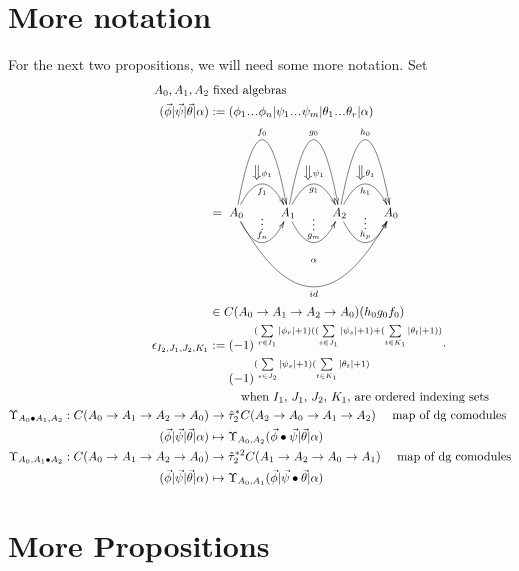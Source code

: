 \section{More notation}
For the next two propositions, we will need 
some more notation. Set
\begin{align*}
A_0, A_1, A_2
&\textrm{ fixed algebras}\\
(\vec{\phi} | \vec{\psi} | \vec{\theta}| \alpha) 
&:= 
(\phi_1\smdots\phi_n | \psi_1\smdots\psi_m| 
  \theta_1 \smdots \theta_r|\alpha)\\
&= 
\xymatrix{
A_0 \ar@/^5pc/[r]^{f_0} 
\ar@/^2pc/[r]^{\big\Downarrow \phi_1}_{f_1} 
\ar@/_2pc/[r]^{\substack{\vdots\\ f_n}}
\ar@/_5pc/[rrr]_{id}^{\substack{\alpha \\ \\ \\ \\ }}
& A_1 \ar@/^5pc/[r]^{g_0} 
\ar@/^2pc/[r]^{\big\Downarrow \psi_1}_{g_1} 
\ar@/_2pc/[r]^{\substack{\vdots\\ g_m}}
& A_2 \ar@/^5pc/[r]^{h_0} 
\ar@/^2pc/[r]^{\big\Downarrow \theta_1}_{h_1} 
\ar@/_2pc/[r]^{\substack{\vdots\\ h_p}}
& A_0
}\\
&\in 
C(A_0 \to A_1 \to A_2 \to A_0)(h_0g_0f_0)\\
\epsilon_{I_2,J_1,J_2,K_1} 
&:= 
(-1)^{(\sum \limits_{r \in I_1}|\phi_r|+1)
  ((\sum \limits_{s \in J_1}|\psi_s|+1) + 
  (\sum \limits_{t \in K_1}|\theta_t|+1))}\cdot\\
&\phantom{{}:={}} 
  (-1)^{(\sum \limits_{s \in J_2}|\psi_s|+1)
  (\sum \limits_{t \in K_1}|\theta_t|+1)}\\
&\phantom{{}:={}}  
  \quad \textrm{when $I_1$, $J_1$, $J_2$, $K_1$, 
  are ordered indexing sets}\\  
\Upsilon_{A_0\bullet A_1, A_2}:
  C(A_0 \to A_1 \to A_2 \to A_0) 
&\to
\hat{\tau}_2^*C(A_2 \to A_0 \to A_1 \to A_2)
  \quad \textrm{ map of dg comodules}\\
(\vec{\phi} | \vec{\psi} | \vec{\theta}| \alpha) 
&\mapsto 
\Upsilon_{A_0,A_2}
  (\vec{\phi} \bullet \vec{\psi} | \vec{\theta}| \alpha)\\
\Upsilon_{A_0,A_1\bullet A_2}:
  C(A_0 \to A_1 \to A_2 \to A_0) 
&\to
\hat{\tau}_2^{*2}C(A_1 \to A_2 \to A_0 \to A_1)
  \quad \textrm{ map of dg comodules}\\
(\vec{\phi} | \vec{\psi} | \vec{\theta}| \alpha) 
&\mapsto 
\Upsilon_{A_0,A_1}
  (\vec{\phi}|\vec{\psi} \bullet \vec{\theta}| \alpha)\\
\end{align*}

\section{More Propositions}

